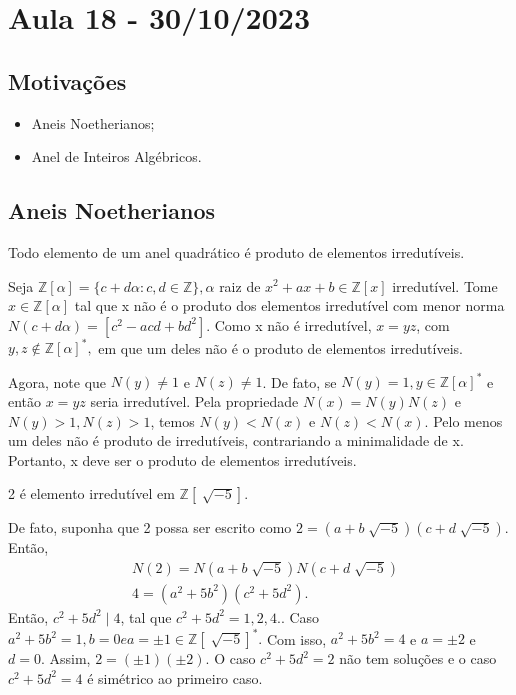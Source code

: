 \documentclass[algebraII_notes.tex]{subfiles}
\begin{document}
\section{Aula 18 - 30/10/2023}
\subsection{Motivações}
\begin{itemize}
	\item Aneis Noetherianos;
	\item Anel de Inteiros Algébricos.
\end{itemize}
\subsection{Aneis Noetherianos}
\begin{prop*}
	Todo elemento de um anel quadrático é produto de elementos irredutíveis.
\end{prop*}
\begin{proof*}
	Seja \(\mathbb{Z}[\alpha ] = \{c + d\alpha : c, d\in \mathbb{Z}\}, \alpha \) raiz de \(x^{2} + ax + b\in \mathbb{Z}[x]\) irredutível.
	Tome \(x\in \mathbb{Z}[\alpha ]\) tal que x não é o produto dos elementos irredutível com menor norma \(N(c+d\alpha ) = [c^{2}-acd + bd^{2}]\).
	Como x não é irredutível, \(x=yz\), com \(y,z\not\in \mathbb{Z}[\alpha ]^{*},\) em que um deles não é o produto de elementos
	irredutíveis.

	Agora, note que \(N(y)\neq1\) e \(N(z)\neq1\). De fato, se \(N(y)=1, y\in \mathbb{Z}[\alpha ]^{*}\) e então \(x=yz\) seria irredutível.
	Pela propriedade \(N(x) = N(y)N(z)\) e \(N(y) > 1, N(z) > 1\), temos \(N(y) < N(x)\) e \(N(z) < N(x)\).
	Pelo menos um deles não é produto de irredutíveis, contrariando a minimalidade de x. Portanto, x deve ser o produto
	de elementos irredutíveis. \qedsymbol
\end{proof*}
\begin{example}
	2 é elemento irredutível em \(\mathbb{Z}[\sqrt[]{-5}].\)

	De fato, suponha que 2 possa ser escrito como \(2 = (a + b\sqrt[]{-5})(c+d\sqrt[]{-5}).\) Então,
	\begin{align*}
		 & N(2) = N(a+b\sqrt[]{-5})N(c+d\sqrt[]{-5}) \\
		 & 4 = (a^{2} + 5b^{2})(c^{2}+5d^{2}).
	\end{align*}
	Então, \(c^{2} + 5d^{2}\mid 4\), tal que \(c^{2} + 5d^{2} = 1, 2, 4.\). Caso \(a^{2}+5b^{2} = 1, b = 0 e a = \pm 1\in \mathbb{Z}[\sqrt[]{-5}]^{*}.\)
	Com isso, \(a^{2} + 5b^{2} = 4\) e \(a = \pm 2\) e \(d=0.\) Assim, \(2=(\pm1)(\pm2).\)
	O caso \(c^{2} + 5d^{2} = 2\) não tem soluções e o caso \(c^{2} + 5d^{2} = 4\) é simétrico ao primeiro caso.
\end{example}
\end{document}
